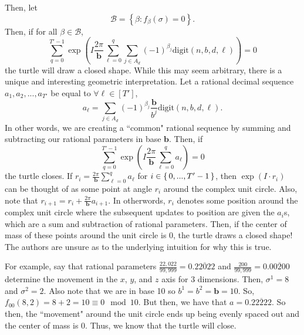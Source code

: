 \documentclass[11pt,titlepage]{article}
\newcommand{\rationalPeriodTotal}{{T}'}
\newcommand{\commonBase}{{\pmb{b}}}
\newcommand{\numbToCommon}{\frac{\commonBase}{b^j}}
\newcommand{\commonToAngle}{\frac{2\pi}{\commonBase}}
\begin{document}
Then, let
$$
  \mathcal{B} = \left\{\beta: f_\beta(\sigma) = 0\right\}.
$$
Then, if for all
$\beta \in \mathcal{B}$,
$$
\sum_{q = 0}^{\rationalPeriodTotal - 1}
  \exp\left(
      I 
      \commonToAngle 
      \sum_{\ell = 0}^{q}
      \sum_{j \in A_d}
          \left(-1\right) ^ {\beta_{j}}
          \mathrm{digit}(n, b, d, \ell)
  \right) = 0
$$
the turtle will draw a closed shape. While this may seem arbitrary, there is a unique
and interesting geometric interpretation. 
Let a rational decimal sequence $a_1, a_2, ..., a_{\rationalPeriodTotal}$ be equal to
$
\forall \ell \in [\rationalPeriodTotal]
$,
$$
a_\ell = \sum_{j \in A_d}
\left(-1\right) ^ {\beta_{j}}
\numbToCommon
\mathrm{digit}(n, b, d, \ell).
$$
In other words, we are creating a ``common" rational sequence by summing and subtracting
our rational parameters in base $\commonBase$. Then,
if $$
\sum_{q = 0}^{\rationalPeriodTotal - 1}
\exp\left(
    I 
    \commonToAngle 
    \sum_{\ell = 0}^{q}
      a_\ell
  \right) = 0
$$
the turtle closes.
If $r_i = \commonToAngle \sum_{\ell = 0}^{q} a_\ell$ for 
$i \in \set{0, ..., \rationalPeriodTotal - 1}$, then $\exp(I \cdot r_i)$ can be thought of as some point at angle $r_i$ around the 
complex unit circle. Also, note that $r_{i + 1} = r_i + \commonToAngle a_{i+1}$. In otherwords,
$r_i$ denotes some position around the complex unit circle where the subsequent updates
to position are given the $a_i$s, which are a sum and subtraction of rational parameters. Then, if the center of
mass of these points around the unit circle is $0$, the turtle draws a closed shape!
The authors are unsure as to the underlying intuition for why this is true.


For example, say that rational parameters $\frac{22,022}{99,999} = 0.\overline{22022}$ and
$\frac{200}{99,999} = 0.\overline{00200}$ determine the movement in the $x$, $y$, and $z$ axis for $3$ dimensions.
Then, $\sigma^1 = 8$ and $\sigma^2 = 2$. Also note that we are in base 10 so $b^1 = b^2 = \commonBase = 10$.
So, $f_{00}(8, 2) = 8 + 2 = 10 \equiv 0 \mod 10$. But then, we have that $a = 0.\overline{22222}$.
So then, the ``movement" around the unit circle ends up being evenly spaced out and the center of mass
is 0. Thus, we know that the turtle will close.
\end{document}
